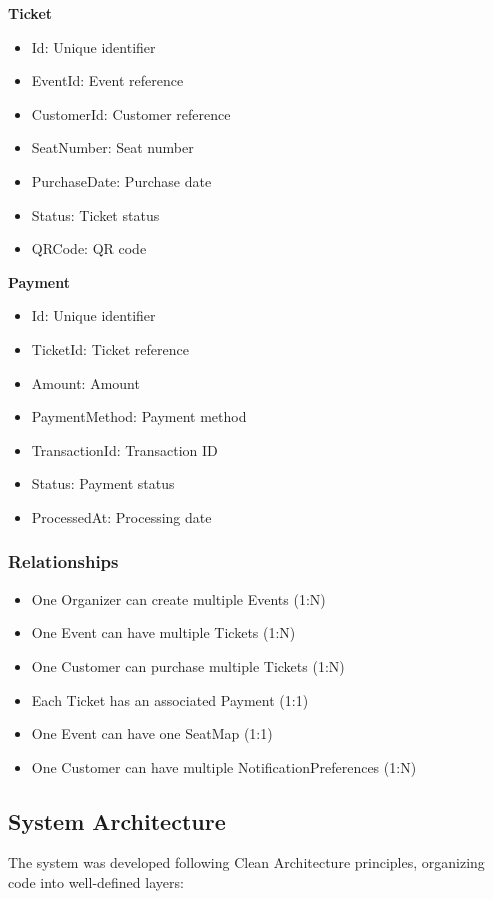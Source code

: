 \documentclass[12pt,a4paper]{article}
\begin{document}
\textbf{Ticket}
\begin{itemize}
    \item Id: Unique identifier
    \item EventId: Event reference
    \item CustomerId: Customer reference
    \item SeatNumber: Seat number
    \item PurchaseDate: Purchase date
    \item Status: Ticket status
    \item QRCode: QR code
\end{itemize}

\textbf{Payment}
\begin{itemize}
    \item Id: Unique identifier
    \item TicketId: Ticket reference
    \item Amount: Amount
    \item PaymentMethod: Payment method
    \item TransactionId: Transaction ID
    \item Status: Payment status
    \item ProcessedAt: Processing date
\end{itemize}

\subsubsection{Relationships}
\begin{itemize}
    \item One Organizer can create multiple Events (1:N)
    \item One Event can have multiple Tickets (1:N)
    \item One Customer can purchase multiple Tickets (1:N)
    \item Each Ticket has an associated Payment (1:1)
    \item One Event can have one SeatMap (1:1)
    \item One Customer can have multiple NotificationPreferences (1:N)
\end{itemize}

\subsection{System Architecture}

The system was developed following Clean Architecture principles, organizing code into well-defined layers:
\end{document}
